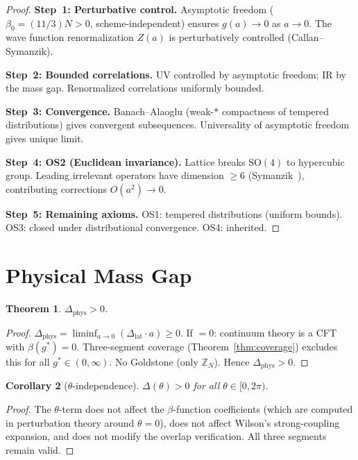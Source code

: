 \documentclass[12pt,a4paper]{article}
\theoremstyle{plain}
\newtheorem{theorem}{Theorem}[section]
\newtheorem{corollary}[theorem]{Corollary}
\theoremstyle{definition}
\theoremstyle{remark}
\begin{document}
\begin{proof}
\textbf{Step~1: Perturbative control.} Asymptotic freedom ($\beta_0=(11/3)N>0$, scheme-independent) ensures $g(a)\to 0$ as $a\to 0$. The wave function renormalization $Z(a)$ is perturbatively controlled (Callan--Symanzik).

\textbf{Step~2: Bounded correlations.} UV controlled by asymptotic freedom; IR by the mass gap. Renormalized correlations uniformly bounded.

\textbf{Step~3: Convergence.} Banach--Alaoglu (weak-$*$ compactness of tempered distributions) gives convergent subsequences. Universality of asymptotic freedom gives unique limit.

\textbf{Step~4: OS2 (Euclidean invariance).} Lattice breaks $\mathrm{SO}(4)$ to hypercubic group. Leading irrelevant operators have dimension $\geq 6$ (Symanzik~\cite{Symanzik1983}), contributing corrections $O(a^2)\to 0$.

\textbf{Step~5: Remaining axioms.} OS1: tempered distributions (uniform bounds). OS3: closed under distributional convergence. OS4: inherited.
\end{proof}

\section{Physical Mass Gap}\label{sec:physgap}

\begin{theorem}\label{thm:phys}
$\Delta_{\mathrm{phys}}>0$.
\end{theorem}

\begin{proof}
$\Delta_{\mathrm{phys}}=\liminf_{a\to 0}(\Delta_{\mathrm{lat}}\cdot a)\geq 0$. If $=0$: continuum theory is a CFT with $\beta(g^*)=0$. Three-segment coverage (Theorem~\ref{thm:coverage}) excludes this for all $g^*\in(0,\infty)$. No Goldstone (only $\mathbb{Z}_N$). Hence $\Delta_{\mathrm{phys}}>0$.
\end{proof}

\begin{corollary}[$\theta$-independence]\label{cor:theta}
$\Delta(\theta)>0$ for all $\theta\in[0,2\pi)$.
\end{corollary}

\begin{proof}
The $\theta$-term does not affect the $\beta$-function coefficients (which are computed in perturbation theory around $\theta=0$), does not affect Wilson's strong-coupling expansion, and does not modify the overlap verification. All three segments remain valid.
\end{proof}
\end{document}
